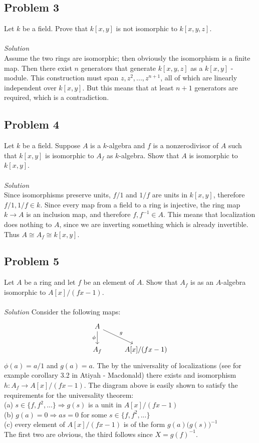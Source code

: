 \documentclass[12 pt]{article}
\begin{document}
\subsection*{Problem 3}
Let $k$ be a field. Prove that $k[x, y]$ is not isomorphic to $k[x, y, z]$.
\\
\\
\emph{Solution}
\\
Assume the two rings are isomorphic; then obviously the isomorphism is a finite map. Then there exist $n$ generators that generate $k[x,y,z]$ as a $k[x,y]$ - module. This construction must span $z, z^2, ... , z^{n+1}$, all of which are linearly independent over $k[x,y]$. But this means that at least $n+1$ generators are required, which is a contradiction.


\subsection*{Problem 4}
Let $k$ be a field. Suppose $A$ is a $k$-algebra and $f$ is a nonzerodivisor of $A$ such that $k[x, y]$ is isomorphic to $A_f$ as $k$-algebra. Show that $A$ is isomorphic to $k[x, y]$.
\\
\\
\emph{Solution}
\\
Since isomorphisms preserve units, $f/1$ and $1/f$ are units in $k[x,y]$, therefore $f/1 , 1/f \in k$. Since every map from a field to a ring is injective, the ring map $k\to A$ is an inclusion map, and therefore $f, f^{-1} \in A$. This means that localization does nothing to $A$, since we are inverting something which is already invertible. Thus $A \cong A_f \cong k[x,y]$.

\subsection*{Problem 5}
Let $A$ be a ring and let $f$ be an element of $A$. Show that $A_f$ is as an $A$-algebra isomorphic to $A[x]/(fx - 1)$.
\\
\\
\emph{Solution}
Consider the following maps:
\[
\begin{tikzcd}
A\arrow[swap]{d}{\phi}\arrow{dr}{g}  \\
A_f & A[x]/(fx-1)
\end{tikzcd}
\]
$\phi(a) = a/1$ and $g(a) = a$. The by the universality of localizations (see for example corollary 3.2 in Atiyah - Macdonald) there exists and isomorphism $h:A_f \to A[x]/(fx-1)$. The diagram above is easily shown to satisfy the requirements for the universality theorem:
\\
(a) $s\in \{f, f^2, ... \} \Rightarrow g(s)$ is a unit in $A[x]/(fx-1)$
\\
(b) $g(a) = 0 \Rightarrow as = 0$ for some $s\in \{f, f^2, ... \}$
\\
(c) every element of $A[x]/(fx-1)$ is of the form $g(a)\big(g(s)\big)^{-1}$
\\
The first two are obvious, the third follows since $X = g(f)^{-1}$.
\end{document}
